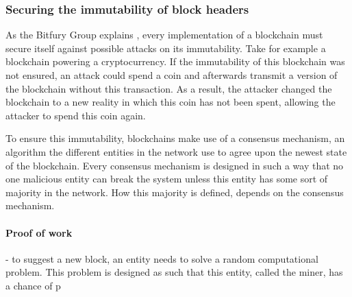 \subsubsection{Securing the immutability of block headers}

\iffalse
- need to secure against attacks on the immutability of its blockchain. otherwise eg. considering a cryptocurrency system, an attacker could spend a coin and afterwards nullify this transaction by transmitting their own version of the blockchain without the spent transaction

- what are consensus mechansisms
\fi

As the Bitfury Group explains \cite{bitfury-pos-vs-pow}, every implementation of a blockchain must secure itself against possible attacks on its immutability. Take for example a blockchain powering a cryptocurrency. If the immutability of this blockchain was not ensured, an attack could spend a coin and afterwards transmit a version of the blockchain without this transaction. As a result, the attacker changed the blockchain to a new reality in which this coin has not been spent, allowing the attacker to spend this coin again.

To ensure this immutability, blockchains make use of a consensus mechanism, an algorithm the different entities in the network use to agree upon the newest state of the blockchain. Every consensus mechanism is designed in such a way that no one malicious entity can break the system unless this entity has some sort of majority in the network. How this majority is defined, depends on the consensus mechanism.

\iffalse
every consensus mechansism: 
- what is needed to suggest a new block
- how does this prevent 
- what are advantages and disadvantages
\fi

\paragraph{Proof of work}

\iffalse
- to suggest a new block, an entity needs to solve a random computational problem. This problem is designed as such that this entity, called the miner, has a chance of p%

